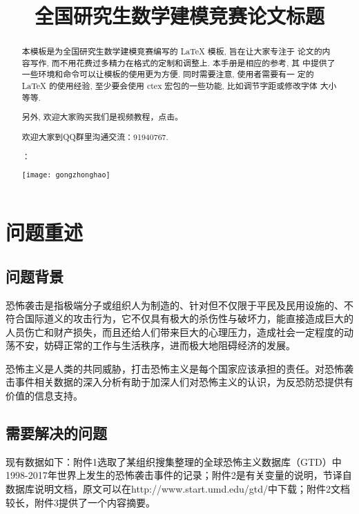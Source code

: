 \documentclass[bwprint]{gmcmthesis}
\title{全国研究生数学建模竞赛论文标题}
\begin{document}
 
\maketitle
 
\begin{abstract}
本模板是为全国研究生数学建模竞赛编写的 \LaTeX{} 模板, 旨在让大家专注于
论文的内容写作, 而不用花费过多精力在格式的定制和调整上. 本手册是相应的参考, 其
中提供了一些环境和命令可以让模板的使用更为方便. 同时需要注意, 使用者需要有一
定的 \LaTeX{} 的使用经验, 至少要会使用 ctex 宏包的一些功能, 比如调节字距或修改字体
大小等等.


另外, 欢迎大家购买我们是视频教程，点击\href{https://item.taobao.com/item.htm?spm=a1z10.1-c.w4004-3473795048.4.ThFQCG&id=43823508044}{}。

欢迎大家到QQ群里沟通交流：91940767.

：

\centerline{\texttt{[image: gongzhonghao]}}


\end{abstract}

\pagestyle{plain}

\tableofcontents
\newpage

\section{问题重述}

\subsection{问题背景}
恐怖袭击是指极端分子或组织人为制造的、针对但不仅限于平民及民用设施的、不符合国际道义的攻击行为，它不仅具有极大的杀伤性与破坏力，能直接造成巨大的人员伤亡和财产损失，而且还给人们带来巨大的心理压力，造成社会一定程度的动荡不安，妨碍正常的工作与生活秩序，进而极大地阻碍经济的发展。

恐怖主义是人类的共同威胁，打击恐怖主义是每个国家应该承担的责任。对恐怖袭击事件相关数据的深入分析有助于加深人们对恐怖主义的认识，为反恐防恐提供有价值的信息支持。
\subsection{需要解决的问题}
现有数据如下：附件1选取了某组织搜集整理的全球恐怖主义数据库（GTD）中1998-2017年世界上发生的恐怖袭击事件的记录；附件2是有关变量的说明，节译自数据库说明文档，原文可以在http://www.start.umd.edu/gtd/中下载；附件2文档较长，附件3提供了一个内容摘要。
\end{document}
